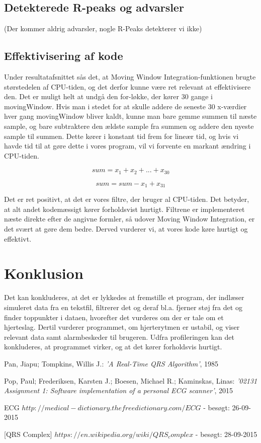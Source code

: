 \documentclass{article}
\begin{document}
\subsection{Detekterede R-peaks og advarsler}
(Der kommer aldrig advarsler, nogle R-Peaks detekterer vi ikke)

\subsection{Effektivisering af kode}
Under resultatafsnittet sås det, at Moving Window Integration-funktionen brugte størstedelen af CPU-tiden, og det derfor kunne være ret relevant at effektivisere den. 
Det er muligt helt at undgå den for-løkke, der kører 30 gange i movingWindow. Hvis man i stedet for at skulle addere de seneste 30 x-værdier hver gang movingWindow bliver kaldt, kunne man bare gemme summen til næste sample, og bare subtraktere den ældste sample fra summen og addere den nyeste sample til summen. Dette kører i konstant tid frem for lineær tid, og hvis vi havde tid til at gøre dette i vores program, vil vi forvente en markant ændring i CPU-tiden.

\begin{equation}
sum = x_1+x_2+...+x_{30}
\end{equation}

\begin{equation}
sum = sum-x_1+x_{31}
\end{equation}

Det er ret positivt, at det er vores filtre, der bruger al CPU-tiden. Det betyder, at alt andet kodemæssigt kører forholdsvist hurtigt. Filtrene er implementeret næste direkte efter de angivne formler, så udover Moving Window Integration, er det svært at gøre dem bedre. Derved vurderer vi, at vores kode køre hurtigt og effektivt.


\newpage
\section{Konklusion}
Det kan konkluderes, at det er lykkedes at fremstille et program, der indlæser simuleret data fra en tekstfil, filtrerer det og deraf bl.a. fjerner støj fra det og finder toppunkter i dataen, hvorefter det vurderes om der er tale om et hjerteslag. Dertil vurderer programmet, om hjerterytmen er ustabil, og viser relevant data samt alarmbeskeder til brugeren. Udfra profileringen kan det konkluderes, at programmet virker, og at det kører forholdsvis hurtigt.

\newpage
\begin{thebibliography}{}
Pan, Jiapu; Tompkins, Willis J.: \textit{'A Real-Time QRS Algorithm'}, 1985

Pop, Paul; Frederiksen, Karsten J.; Boesen, Michael R.; Kaminskas, Linas: \textit{'02131 Assignment 1: Software implementation of a personal ECG scanner'}, 2015

ECG $http://medical-dictionary.thefreedictionary.com/ECG$ - besøgt: 26-09-2015

[QRS Complex] $https://en.wikipedia.org/wiki/QRS_complex$ - besøgt: 28-09-2015
\end{thebibliography}
\end{document}
